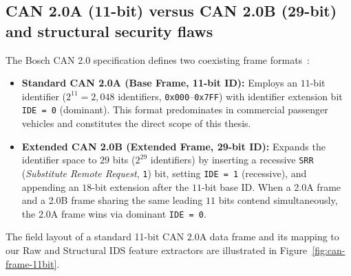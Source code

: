 \documentclass[12pt, a4paper, reqno, oneside]{book}
\DeclareRobustCommand{\code}[1]{\nolinkurl{#1}}
\begin{document}
\subsection{CAN 2.0A (11-bit) versus CAN 2.0B (29-bit) and structural security flaws}
The Bosch CAN 2.0 specification defines two coexisting frame formats~\cite{bosch1991can,iso11898_1_2015}:
\begin{itemize}
    \item \textbf{Standard CAN 2.0A (Base Frame, 11-bit ID):} Employs an $11$-bit identifier ($2^{11} = 2{,}048$ identifiers, \texttt{0x000}--\texttt{0x7FF}) with identifier extension bit \code{IDE = 0} (dominant). This format predominates in commercial passenger vehicles and constitutes the direct scope of this thesis.
    \item \textbf{Extended CAN 2.0B (Extended Frame, 29-bit ID):} Expands the identifier space to $29$ bits ($2^{29}$ identifiers) by inserting a recessive \code{SRR} (\textit{Substitute Remote Request}, \texttt{1}) bit, setting \code{IDE = 1} (recessive), and appending an $18$-bit extension after the $11$-bit base ID. When a 2.0A frame and a 2.0B frame sharing the same leading $11$ bits contend simultaneously, the 2.0A frame wins via dominant \code{IDE = 0}.
\end{itemize}

The field layout of a standard 11-bit CAN 2.0A data frame and its mapping to our Raw and Structural IDS feature extractors are illustrated in Figure~\ref{fig:can-frame-11bit}.
\end{document}
